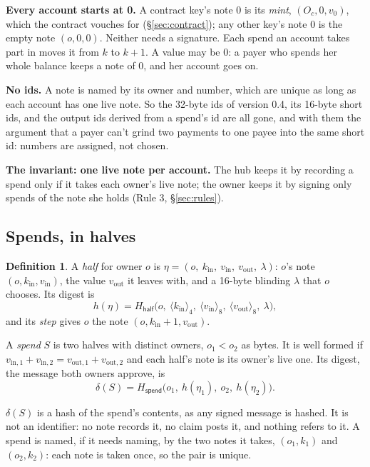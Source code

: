 \documentclass[11pt]{article}
\theoremstyle{plain}
\theoremstyle{definition}
\newtheorem{definition}{Definition}
\newcommand{\be}[2]{\langle #1\rangle_{#2}}
\newcommand{\Ht}[1]{H_{\textsf{#1}}}
\newcommand{\Oc}{O_c}
\newcommand{\kin}{k_{\mathrm{in}}}
\newcommand{\vin}{v_{\mathrm{in}}}
\newcommand{\vout}{v_{\mathrm{out}}}
\begin{document}
\textbf{Every account starts at 0.} A contract key's note 0 is its
\emph{mint}, $(\Oc, 0, v_0)$, which the contract vouches for
(\S\ref{sec:contract}); any other key's note 0 is the empty note $(o, 0,
0)$. Neither needs a signature. Each spend an account takes part in
moves it from $k$ to $k + 1$. A value may be 0: a payer who spends her
whole balance keeps a note of 0, and her account goes on.

\textbf{No ids.} A note is named by its owner and number, which are
unique as long as each account has one live note. So the
32-byte ids of version 0.4, its 16-byte short ids, and the output ids
derived from a spend's id are all gone, and with them the argument that
a payer can't grind two payments to one payee into the same short id:
numbers are assigned, not chosen.

\textbf{The invariant: one live note per account.} The hub keeps it by
recording a spend only if it takes each owner's live note; the owner
keeps it by signing only spends of the note she holds (Rule 3,
\S\ref{sec:rules}).

\subsection{Spends, in halves}\label{sec:spend}

\begin{definition}
A \emph{half} for owner $o$ is $\eta = (o,\ \kin,\ \vin,\ \vout,\
\lambda)$: $o$'s note $(o, \kin, \vin)$, the value $\vout$ it leaves
with, and a 16-byte blinding $\lambda$ that $o$ chooses. Its digest is
\[
  h(\eta) = \Ht{half}\big(o,\ \be{\kin}{4},\ \be{\vin}{8},\
  \be{\vout}{8},\ \lambda\big),
\]
and its \emph{step} gives $o$ the note $(o, \kin + 1, \vout)$.

A \emph{spend} $S$ is two halves with distinct owners, $o_1 < o_2$ as
bytes. It is well formed if $v_{\mathrm{in},1} + v_{\mathrm{in},2} =
v_{\mathrm{out},1} + v_{\mathrm{out},2}$ and each half's note is its
owner's live one. Its digest, the message both owners approve, is
\[
  \delta(S) = \Ht{spend}\big(o_1,\ h(\eta_1),\ o_2,\ h(\eta_2)\big).
\]
\end{definition}

$\delta(S)$ is a hash of the spend's contents, as any signed message is
hashed. It is not an identifier: no note records it, no claim posts it,
and nothing refers to it. A spend is named, if it needs naming, by the
two notes it takes, $(o_1, k_1)$ and $(o_2, k_2)$: each note is taken
once, so the pair is unique.
\end{document}

